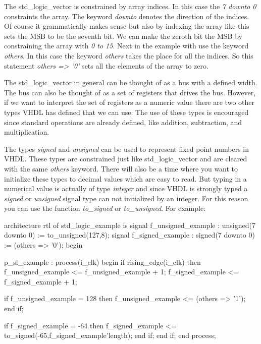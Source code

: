 The std\_logic\_vector is constrained by array indices. In this case the \emph{7 downto 0} constraints the array. The keyword \emph{downto} denotes the direction of the indices. Of course it grammatically makes sense but also by indexing the array like this sets the \ac{MSB} to be the seventh bit. We can make the zeroth bit the \ac{MSB} by constraining the array with \emph{0 to 15}. Next in the example with use the keyword \emph{others}. In this case the keyword \emph{others} takes the place for all the indices. So this statement \emph{others => '0'} sets all the elements of the array to zero. 
	
The std\_logic\_vector in general can be thought of as a bus with a defined width. The bus can also be thought of as a set of registers that drives the bus. However, if we want to interpret the set of registers as a numeric value there are two other types \ac{VHDL} has defined that we can use. The use of these types is encouraged since standard operations are already defined, like addition, subtraction, and multiplication. 

The types \emph{signed} and \emph{unsigned} can be used to represent fixed point numbers in \ac{VHDL}. These types are constrained just like std\_logic\_vector and are cleared with the same \emph{others} keyword. There will also be a time where you want to initialize these types to decimal values which are easy to read. But typing in a numerical value is actually of type \emph{integer} and since \ac{VHDL} is strongly typed a \emph{signed} or \emph{unsigned} signal type can not initialized by an integer. For this reason you can use the function \emph{to\_signed} or \emph{to\_unsigned}. For example:

\begin{VHDLlisting}[tabsize=4]
architecture rtl of std_logic_example is
    signal f_unsigned_example : unsigned(7 downto 0) := to_unsigned(127,8);
    signal f_signed_example   : signed(7 downto 0)   := (others => '0');
begin

p_sl_example : process(i_clk)
begin
    if rising_edge(i_clk) then
        f_unsigned_example <= f_unsigned_example + 1;
        f_signed_example   <= f_signed_example   + 1;
        
        if f_unsigned_example = 128 then
            f_unsigned_example <= (others => '1');
        end if;
        
        if f_signed_example = -64 then
            f_signed_example <= to_signed(-65,f_signed_example'length);
        end if;		
    end if;
end process;
\end{VHDLlisting}

